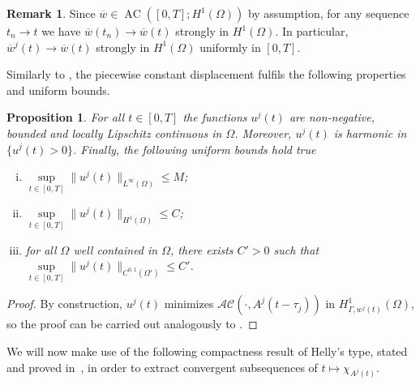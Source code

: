 \documentclass[a4paper,11pt,reqno]{amsart}
\numberwithin{equation}{section}
\newtheorem{prop}[teo]{Proposition}
\theoremstyle{definition}
\newtheorem{remark}[teo]{Remark}
\theoremstyle{remark}
\DeclareMathOperator{\AC}{AC}
\begin{document}
\begin{remark}\label{remark:convergence_wj}
    Since $\overline w \in \AC([0, T]; H^1(\Omega))$ by assumption, for any sequence $t_n \to t$ we have $\overline w(t_n) \to \overline w(t)$ strongly in $H^1(\Omega)$. In particular, $\overline w^j(t) \to \overline w(t)$ strongly in $H^1(\Omega)$ uniformly in $[0, T]$.
\end{remark}

Similarly to , the piecewise constant displacement fulfils the following properties and uniform bounds.

\begin{prop}\label{prop:bound} For all $t\in[0,T]$ the functions $u^j(t)$ are non-negative, bounded and locally Lipschitz continuous in $\Omega$. Moreover, $u^j(t)$ is harmonic in $\{u^j(t)>0\}$. Finally, the following uniform bounds hold true
\begin{enumerate}[(i)]
    \item $\sup\limits_{t\in [0,T]}\|u^j(t)\|_{L^\infty(\Omega)}\le M$;
    \item $\sup\limits_{t\in [0,T]}\|u^j(t)\|_{H^1(\Omega)}\le C$;
    \item for all $\Omega$ well contained in $\Omega$, there exists $C'>0$ such that $\sup\limits_{t\in [0,T]}\|u^j(t)\|_{C^{0,1}(\Omega')}\le C'$.
\end{enumerate}
\end{prop}

\begin{proof}
By construction, $u^j(t)$ minimizes $\mathcal{AC}(\cdot ,A^j(t-\tau_j))$ in $H^1_{\Gamma,w^j(t)}(\Omega)$, so the proof can be carried out analogously to .
\end{proof}

We will now make use of the following compactness result of Helly's type, stated and proved in~\cite[Lemma 6.1]{RivScilSol}, in order to extract convergent subsequences of $t\mapsto \chi_{A^{j}(t)}$.
\end{document}
